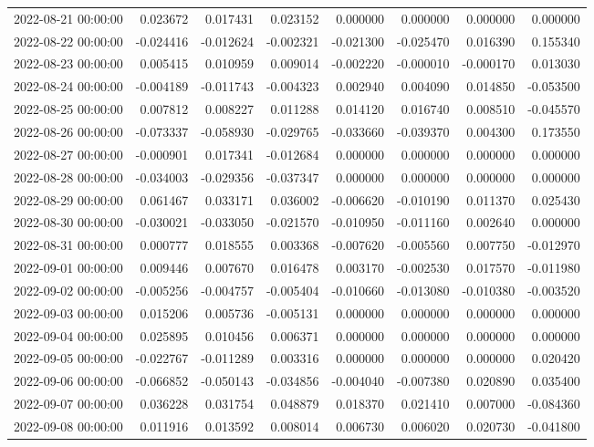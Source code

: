 \begin{tabular}{lrrrrrrr}
2022-08-21 00:00:00 & 0.023672 & 0.017431 & 0.023152 & 0.000000 & 0.000000 & 0.000000 & 0.000000 \\
2022-08-22 00:00:00 & -0.024416 & -0.012624 & -0.002321 & -0.021300 & -0.025470 & 0.016390 & 0.155340 \\
2022-08-23 00:00:00 & 0.005415 & 0.010959 & 0.009014 & -0.002220 & -0.000010 & -0.000170 & 0.013030 \\
2022-08-24 00:00:00 & -0.004189 & -0.011743 & -0.004323 & 0.002940 & 0.004090 & 0.014850 & -0.053500 \\
2022-08-25 00:00:00 & 0.007812 & 0.008227 & 0.011288 & 0.014120 & 0.016740 & 0.008510 & -0.045570 \\
2022-08-26 00:00:00 & -0.073337 & -0.058930 & -0.029765 & -0.033660 & -0.039370 & 0.004300 & 0.173550 \\
2022-08-27 00:00:00 & -0.000901 & 0.017341 & -0.012684 & 0.000000 & 0.000000 & 0.000000 & 0.000000 \\
2022-08-28 00:00:00 & -0.034003 & -0.029356 & -0.037347 & 0.000000 & 0.000000 & 0.000000 & 0.000000 \\
2022-08-29 00:00:00 & 0.061467 & 0.033171 & 0.036002 & -0.006620 & -0.010190 & 0.011370 & 0.025430 \\
2022-08-30 00:00:00 & -0.030021 & -0.033050 & -0.021570 & -0.010950 & -0.011160 & 0.002640 & 0.000000 \\
2022-08-31 00:00:00 & 0.000777 & 0.018555 & 0.003368 & -0.007620 & -0.005560 & 0.007750 & -0.012970 \\
2022-09-01 00:00:00 & 0.009446 & 0.007670 & 0.016478 & 0.003170 & -0.002530 & 0.017570 & -0.011980 \\
2022-09-02 00:00:00 & -0.005256 & -0.004757 & -0.005404 & -0.010660 & -0.013080 & -0.010380 & -0.003520 \\
2022-09-03 00:00:00 & 0.015206 & 0.005736 & -0.005131 & 0.000000 & 0.000000 & 0.000000 & 0.000000 \\
2022-09-04 00:00:00 & 0.025895 & 0.010456 & 0.006371 & 0.000000 & 0.000000 & 0.000000 & 0.000000 \\
2022-09-05 00:00:00 & -0.022767 & -0.011289 & 0.003316 & 0.000000 & 0.000000 & 0.000000 & 0.020420 \\
2022-09-06 00:00:00 & -0.066852 & -0.050143 & -0.034856 & -0.004040 & -0.007380 & 0.020890 & 0.035400 \\
2022-09-07 00:00:00 & 0.036228 & 0.031754 & 0.048879 & 0.018370 & 0.021410 & 0.007000 & -0.084360 \\
2022-09-08 00:00:00 & 0.011916 & 0.013592 & 0.008014 & 0.006730 & 0.006020 & 0.020730 & -0.041800 \\

\end{tabular}
